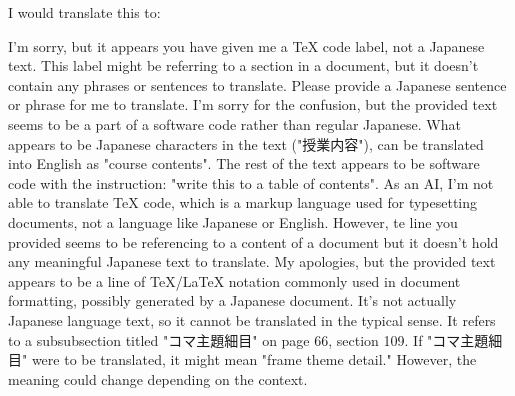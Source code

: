 \relax
\providecommand\hyper@newdestlabel[2]{}
I would translate this to:


I'm sorry, but it appears you have given me a TeX code label, not a Japanese text. This label might be referring to a section in a document, but it doesn't contain any phrases or sentences to translate. Please provide a Japanese sentence or phrase for me to translate.
I'm sorry for the confusion, but the provided text seems to be a part of a software code rather than regular Japanese. What appears to be Japanese characters in the text ("授業内容"), can be translated into English as "course contents". The rest of the text appears to be software code with the instruction: "write this to a table of contents".
As an AI, I'm not able to translate TeX code, which is a markup language used for typesetting documents, not a language like Japanese or English. However, te line you provided seems to be referencing to a content of a document but it doesn't hold any meaningful Japanese text to translate.
My apologies, but the provided text appears to be a line of TeX/LaTeX notation commonly used in document formatting, possibly generated by a Japanese document. It's not actually Japanese language text, so it cannot be translated in the typical sense. It refers to a subsubsection titled "コマ主題細目" on page 66, section 109. If "コマ主題細目" were to be translated, it might mean "frame theme detail." However, the meaning could change depending on the context.
